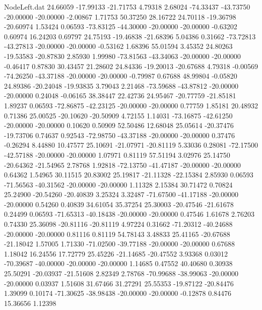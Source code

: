 \begin{filecontents}{NodeLeft.dat}
  24.66059  -17.99133  -21.71753     4.79318    2.68024  -74.33437  -43.73750  -20.00000  -20.00000   -2.00867    1.71753   50.37250   28.16722
  24.70118  -19.36798  -20.60974     1.53424    0.06593  -73.83125  -44.30000  -20.00000  -20.00000   -0.63202    0.60974   16.24203    0.69797
  24.75193  -19.46838  -21.68396     5.04386    0.31662  -73.72813  -43.27813  -20.00000  -20.00000   -0.53162    1.68396   55.01594    3.45352
  24.80263  -19.53583  -20.87830     2.85930    1.99980  -73.81563  -43.34063  -20.00000  -20.00000   -0.46417    0.87830   30.43457   21.28602
  24.84336  -19.20013  -20.67688     4.79318   -0.00569  -74.26250  -43.37188  -20.00000  -20.00000   -0.79987    0.67688   48.99804   -0.05820
  24.89386  -20.24048  -19.93835     3.79043    2.21468  -73.59688  -43.87812  -20.00000  -20.00000    0.24048   -0.06165   38.38447   22.42736
  24.95467  -20.77759  -21.85181     1.89237    0.06593  -72.86875  -42.23125  -20.00000  -20.00000    0.77759    1.85181   20.48932    0.71386
  25.00525  -20.10620  -20.50909     4.72155    1.14031  -73.16875  -42.61250  -20.00000  -20.00000    0.10620    0.50909   52.50486   12.68048
  25.05614  -20.37476  -19.73706     0.74637    0.92543  -72.98750  -43.37188  -20.00000  -20.00000    0.37476   -0.26294    8.44880   10.47577
  25.10691  -21.07971  -20.81119     5.33036    0.28081  -72.17500  -42.57188  -20.00000  -20.00000    1.07971    0.81119   57.51194    3.02976
  25.14750  -20.64362  -21.54965     2.78768    1.92818  -72.13750  -41.47187  -20.00000  -20.00000    0.64362    1.54965   30.11515   20.83002
  25.19817  -21.11328  -22.15384     2.85930    0.06593  -71.56563  -40.31562  -20.00000  -20.00000    1.11328    2.15384   30.71472    0.70824
  25.24900  -20.54260  -20.40839     3.25324    3.32487  -71.67500  -41.17188  -20.00000  -20.00000    0.54260    0.40839   34.61054   35.37254
  25.30003  -20.47546  -21.61678     0.24499    0.06593  -71.65313  -40.18438  -20.00000  -20.00000    0.47546    1.61678    2.76203    0.74330
  25.36098  -20.81116  -20.81119     4.97224    0.31662  -71.20312  -40.24688  -20.00000  -20.00000    0.81116    0.81119   54.78143    3.48833
  25.41165  -20.67688  -21.18042     1.57005    1.71330  -71.02500  -39.77188  -20.00000  -20.00000    0.67688    1.18042   16.24556   17.72779
  25.45226  -21.14685  -20.47552     3.93368    0.03012  -70.39687  -40.00000  -20.00000  -20.00000    1.14685    0.47552   40.40680    0.30938
  25.50291  -20.03937  -21.51608     2.82349    2.78768  -70.99688  -38.99063  -20.00000  -20.00000    0.03937    1.51608   31.67466   31.27291
  25.55353  -19.87122  -20.84476     1.39099    0.10174  -71.30625  -38.98438  -20.00000  -20.00000   -0.12878    0.84476   15.36656    1.12398

\end{filecontents}
